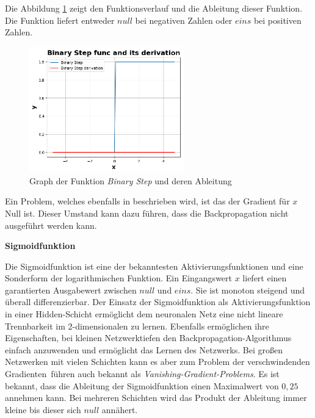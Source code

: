 Die Abbildung \ref{img:binary_step_func_graph} zeigt den Funktionsverlauf und die Ableitung dieser Funktion. Die Funktion liefert entweder $null$ bei negativen Zahlen oder $eins$ bei positiven Zahlen.

\begin{figure}[!ht]
	\includegraphics[width=0.6\textwidth]{content/chapter_basics/plots/binary_step_func_plot.eps}
	\centering
	\caption{Graph der Funktion \textit{Binary Step} und deren Ableitung}
	\label{img:binary_step_func_graph}
\end{figure}

Ein Problem, welches ebenfalls in \cite[311-312]{sharma-2020} beschrieben wird, ist das der Gradient für $x$ Null ist. Dieser Umstand kann dazu führen, dass die Backpropagation nicht ausgeführt werden kann.\vspace{0.2cm}

%
\textbf{Sigmoidfunktion}\vspace{0.2cm}

Die Sigmoidfunktion ist eine der bekanntesten Aktivierungsfunktionen und eine Sonderform der logarithmischen Funktion. Ein Eingangswert $x$ liefert einen garantierten Ausgabewert zwischen $null$ und $eins$. Sie ist monoton steigend und überall differenzierbar. Der Einsatz der Sigmoidfunktion als Aktivierungsfunktion in einer Hidden-Schicht ermöglicht dem neuronalen Netz eine nicht lineare Trennbarkeit im 2-dimensionalen zu lernen. Ebenfalls ermöglichen ihre Eigenschaften, bei kleinen Netzwerktiefen den Backpropagation-Algorithmus einfach anzuwenden und ermöglicht das Lernen des Netzwerks. Bei großen Netzwerken mit vielen Schichten kann es aber zum \glqq Problem der verschwindenden Gradienten\grqq \ führen auch bekannt als \textit{Vanishing-Gradient-Problems}. Es ist bekannt, dass die Ableitung der Sigmoidfunktion einen Maximalwert von $0,25$ annehmen kann. Bei mehreren Schichten wird das Produkt der Ableitung immer kleine bis dieser sich $null$ annähert.\vspace{0.2cm}

